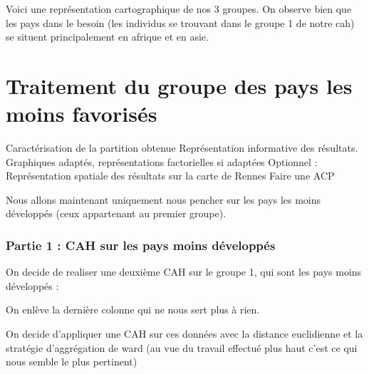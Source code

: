 \documentclass[
]{article}
\newenvironment{Shaded}{}{}
\newcommand{\DecValTok}[1]{#1}
\newcommand{\FunctionTok}[1]{#1}
\newcommand{\NormalTok}[1]{#1}
\newcommand{\OtherTok}[1]{\textcolor[rgb]{1.00,0.25,0.00}{#1}}
\newcommand{\SpecialCharTok}[1]{\textcolor[rgb]{0.00,0.50,0.50}{#1}}
\begin{document}
Voici une représentation cartographique de nos 3 groupes. On observe
bien que les pays dans le besoin (les individus se trouvant dans le
groupe 1 de notre cah) se situent principalement en afrique et en asie.

\hypertarget{traitement-du-groupe-des-pays-les-moins-favorisuxe9s}{%
\section{Traitement du groupe des pays les moins
favorisés}\label{traitement-du-groupe-des-pays-les-moins-favorisuxe9s}}

Caractérisation de la partition obtenue Représentation informative des
résultats. Graphiques adaptés, représentations factorielles si adaptées
Optionnel : Représentation spatiale des résultats sur la carte de Rennes
Faire une ACP

Nous allons maintenant uniquement nous pencher sur les pays les moins
développés (ceux appartenant au premier groupe).

\hypertarget{partie-1-cah-sur-les-pays-moins-duxe9veloppuxe9s}{%
\subsubsection{Partie 1 : CAH sur les pays moins
développés}\label{partie-1-cah-sur-les-pays-moins-duxe9veloppuxe9s}}

On decide de realiser une deuxième CAH sur le groupe 1, qui sont les
pays moins développés :

\begin{Shaded}
\end{Shaded}

On enlève la dernière colonne qui ne nous sert plus à rien.

On decide d'appliquer une CAH sur ces données avec la distance
euclidienne et la stratégie d'aggrégation de ward (au vue du travail
effectué plus haut c'est ce qui nous semble le plus pertinent)
\end{document}
